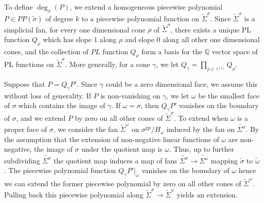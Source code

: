 \documentclass[12pt, oneside]{amsart}   	%
\newcommand{\gp}{\operatorname{gp}}
\numberwithin{equation}{section}
\numberwithin{thm}{section}
\numberwithin{figure}{section}
\begin{document}
To define $\deg_{\sigma}(P)$, we extend a homogeneous piecewise polynomial $P \in PP(\widetilde{\sigma})$ of degree $k$ to a piecewise polynomial function on $\widetilde{\Sigma}^{\sigma}$. Since $\widetilde{\Sigma}^{\sigma}$ is a simplicial fan, for every one dimensional cone $\rho$ of $\widetilde{\Sigma}^{\sigma}$, there exists a unique PL function $Q_{\rho}$ which has slope $1$ along $\rho$ and slope $0$ along all other one dimensional cones, and the collection of $PL$ function $Q_{\rho}$ form a basis for the $\mathbb{Q}$ vector space of PL functions on $\widetilde{\Sigma}^{\sigma}$. More generally, for a cone $\gamma$, we let $Q_{\gamma} = \prod_{\rho \in \gamma^{[1]}} Q_{\rho}$. 


Suppose that $P = Q_{\gamma}P'$. Since $\gamma$ could be a zero dimensional face, we assume this without loss of generality. If $P$ is non-vanishing on $\gamma$, we let $\omega$ be the smallest face of $\sigma$ which contains the image of $\gamma$. If $\omega = \sigma$, then $Q_{\gamma}P'$ vanishes on the boundary of $\sigma$, and we extend $P$ by zero on all other cones of $\widetilde{\Sigma}^{\sigma}$. To extend when $\omega$ is a proper face of $\sigma$, we consider the fan $\widetilde{\Sigma}^{\omega}$ on $\sigma^{\gp}/H_\omega$ induced by the fan on $\widetilde{\Sigma^{\sigma}}$. By the assumption that the extension of non-negative linear functions of $\omega$ are non-negative, the image of $\sigma$ under the quotient map is $\omega$. Thus, up to further subdividing $\widetilde{\Sigma^{\sigma}}$ the quotient map induces a map of fans $\widetilde{\Sigma^{\sigma}} \rightarrow \widetilde{\Sigma^{\omega}}$ mapping $\tilde{\sigma}$ to $\tilde{\omega}$. The piecewise polynomial function $Q_{\gamma}P'|_{\widetilde{\omega}}$ vanishes on the boundary of $\omega$ hence we can extend the former piecewise polynomial by zero on all other cones of $\widetilde{\Sigma}^{\omega}$. Pulling back this piecewise polynomial along $\widetilde{\Sigma}^{\sigma} \rightarrow \widetilde{\Sigma}^{\omega}$ yields an extension.
\end{document}
